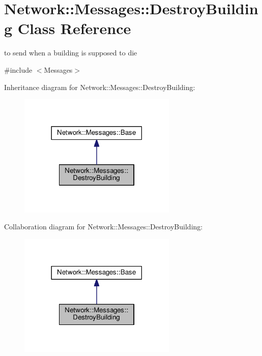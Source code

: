 \hypertarget{class_network_1_1_messages_1_1_destroy_building}{}\section{Network\+:\+:Messages\+:\+:Destroy\+Building Class Reference}
\label{class_network_1_1_messages_1_1_destroy_building}


to send when a building is supposed to die  




{\ttfamily \#include $<$Messages$>$}



Inheritance diagram for Network\+:\+:Messages\+:\+:Destroy\+Building\+:
\nopagebreak
\begin{figure}[H]
\begin{center}
\leavevmode
\includegraphics[width=213pt]{class_network_1_1_messages_1_1_destroy_building__inherit__graph}
\end{center}
\end{figure}


Collaboration diagram for Network\+:\+:Messages\+:\+:Destroy\+Building\+:
\nopagebreak
\begin{figure}[H]
\begin{center}
\leavevmode
\includegraphics[width=213pt]{class_network_1_1_messages_1_1_destroy_building__coll__graph}
\end{center}
\end{figure}
